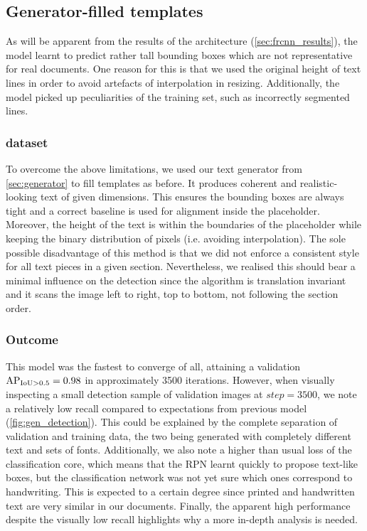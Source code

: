 	\subsection{Generator-filled templates}
		As will be apparent from the results of the \FRCNN{} architecture (\autoref{sec:frcnn_results}), the model learnt to predict rather tall bounding boxes which are not representative for real documents. One reason for this is that we used the original height of text lines in order to avoid artefacts of interpolation in resizing. Additionally, the model picked up peculiarities of the training set, such as incorrectly segmented lines.


		\subsubsection*{ dataset}

			To overcome the above limitations, we used our text generator from \autoref{sec:generator} to fill templates as before. It produces coherent and realistic-looking text of given dimensions. This ensures the bounding boxes are always tight and a correct baseline is used for alignment inside the placeholder. Moreover, the height of the text is within the boundaries of the placeholder while keeping the binary distribution of pixels (i.e. avoiding interpolation). The sole possible disadvantage of this method is that we did not enforce a consistent style for all text pieces in a given section. Nevertheless, we realised this should bear a minimal influence on the detection since the algorithm is translation invariant and it scans the image left to right, top to bottom, not following the section order.

		\subsubsection*{Outcome}

			This model was the fastest to converge of all, attaining a validation \(\operatorname{\operatorname{AP}_{\operatorname{IoU} > 0.5}} = 0.98\) in approximately 3500 iterations. However, when visually inspecting a small detection sample of validation images at \(\mathit{step} = 3500\), we note a relatively low recall compared to expectations from previous model (\autoref{fig:gen_detection}). This could be explained by the complete separation of validation and training data, the two being generated with completely different text and sets of fonts. Additionally, we also note a higher than usual loss of the classification core, which means that the RPN learnt quickly to propose text-like boxes, but the classification network was not yet sure which ones correspond to handwriting. This is expected to a certain degree since printed and handwritten text are very similar in our documents. Finally, the apparent high performance despite the visually low recall highlights why a more in-depth analysis is needed.

